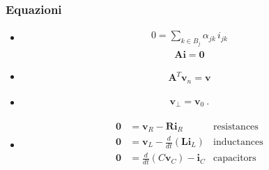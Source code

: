 \documentclass[letterpaper,10pt,english]{jupyterBook}
\begin{document}
\subsubsection*{Equazioni}
\begin{itemize}
\item {} 
\sphinxAtStartPar
{}
\begin{equation*}
\begin{split}0 = \sum_{k \in B_j} \alpha_{jk} \, i_{jk}\end{split}
\end{equation*}\begin{equation*}
\begin{split}\mathbf{A} \mathbf{i} = \mathbf{0}\end{split}
\end{equation*}
\item {} 
\sphinxAtStartPar
{}
\begin{equation*}
\begin{split}\mathbf{A}^T \mathbf{v}_{n} = \mathbf{v}\end{split}
\end{equation*}
\item {} 
\sphinxAtStartPar
{}
\begin{equation*}
\begin{split}\mathbf{v}_{\perp} = \mathbf{v}_0 \ .\end{split}
\end{equation*}
\item {} 
\sphinxAtStartPar
{}
\begin{equation*}
\begin{split}\begin{aligned}
    \mathbf{0} & = \mathbf{v}_R - \mathbf{R} \mathbf{i}_R & \text{resistances} \\
    \mathbf{0} & = \mathbf{v}_L - \frac{d}{dt} \left( \mathbf{L} \mathbf{i}_L \right) & \text{inductances} \\
    \mathbf{0} & = \frac{d}{dt} \left( C \mathbf{v}_C \right) - \mathbf{i}_C & \text{capacitors} \\
  \end{aligned}\end{split}
\end{equation*}
\end{itemize}

\sphinxstepscope
\end{document}
